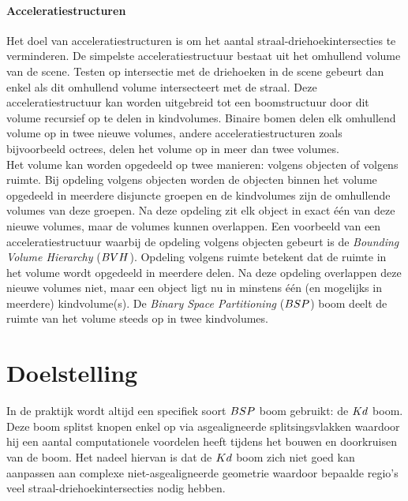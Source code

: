 

\paragraph{Acceleratiestructuren}
Het doel van acceleratiestructuren is om het aantal straal-driehoekintersecties te verminderen.
De simpelste acceleratiestructuur bestaat uit het omhullend volume van de scene.
Testen op intersectie met de driehoeken in de scene gebeurt dan enkel als dit omhullend volume intersecteert met de straal.
Deze acceleratiestructuur kan worden uitgebreid tot een boomstructuur door dit volume recursief op te delen in kindvolumes.
Binaire bomen delen elk omhullend volume op in twee nieuwe volumes, andere acceleratiestructuren zoals bijvoorbeeld octrees, delen het volume op in meer dan twee volumes.
\\

Het volume kan worden opgedeeld op twee manieren: volgens objecten of volgens ruimte.
Bij opdeling volgens objecten worden de objecten binnen het volume opgedeeld in meerdere disjuncte groepen en de kindvolumes zijn de omhullende volumes van deze groepen.
Na deze opdeling zit elk object in exact één van deze nieuwe volumes, maar de volumes kunnen overlappen.
Een voorbeeld van een acceleratiestructuur waarbij de opdeling volgens objecten gebeurt is de \textit{Bounding Volume Hierarchy} ($BVH$).
Opdeling volgens ruimte betekent dat de ruimte in het volume wordt opgedeeld in meerdere delen.
Na deze opdeling overlappen deze nieuwe volumes niet, maar een object ligt nu in minstens één (en mogelijks in meerdere) kindvolume(s).
De \textit{Binary Space Partitioning} ($BSP$) boom deelt de ruimte van het volume steeds op in twee kindvolumes.

\section{Doelstelling}
In de praktijk wordt altijd een specifiek soort $BSP$ boom gebruikt: de $Kd$ boom.
Deze boom splitst knopen enkel op via asgealigneerde splitsingsvlakken waardoor hij een aantal computationele voordelen heeft tijdens het bouwen en doorkruisen van de boom.
Het nadeel hiervan is dat de $Kd$ boom zich niet goed kan aanpassen aan complexe niet-asgealigneerde geometrie waardoor bepaalde regio's veel straal-driehoekintersecties nodig hebben.\\

